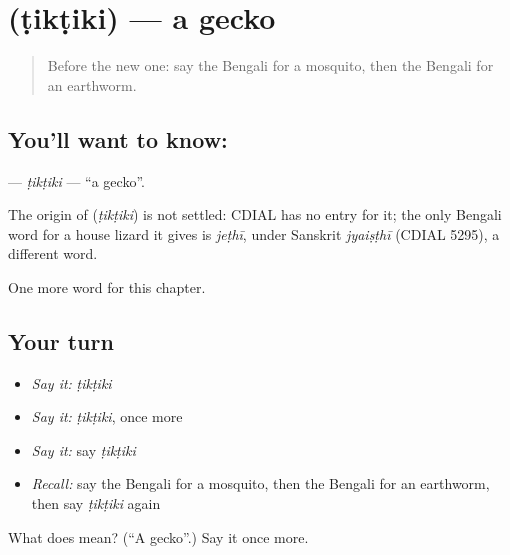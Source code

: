 \section[\texorpdfstring{\bn{টিকটিকি} (ṭikṭiki)}{টিকটিকি (ṭikṭiki)}]{ (ṭikṭiki) — a gecko}

\label{lesson:BN-C122-tiktiki}



\begin{quote}
Before the new one: say the Bengali for a mosquito, then the Bengali for an earthworm.
\end{quote}

\subsection*{You'll want to know: }
\textbf{} — \emph{ṭikṭiki} — \textquotedblleft{}a gecko\textquotedblright{}.

\begin{cousinweb}
The origin of \textbf{} (\emph{ṭikṭiki}) is not settled: CDIAL has no entry for it; the only Bengali word for a house lizard it gives is \emph{jeṭhī}, under Sanskrit \emph{jyaiṣṭhī} (CDIAL 5295), a different word.
\end{cousinweb}

\begin{grammarlens}[title={What you've built}]
One more word for this chapter.
\end{grammarlens}

\subsection*{Your turn}
\begin{itemize}
\raggedright
  \item \emph{Say it:} \emph{ṭikṭiki}
  \item \emph{Say it:} \emph{ṭikṭiki}, once more
  \item \emph{Say it:} say \emph{ṭikṭiki}
  \item \emph{Recall:} say the Bengali for a mosquito, then the Bengali for an earthworm, then say \emph{ṭikṭiki} again
\end{itemize}

\begin{tcolorbox}[breakable,colback=teal!4,colframe=teal!35!black,title={Before you move on}]
What does  mean? (\textquotedblleft{}A gecko\textquotedblright{}.) Say it once more.
\end{tcolorbox}
